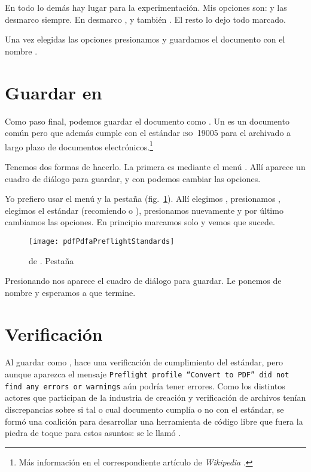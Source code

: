 \documentclass[%
	a5paper,
	10pt,
	twoside,
	openright,
	final,
]{memoir}
\begin{document}
	En todo lo demás hay lugar para la experimentación. Mis opciones son:  y  las desmarco siempre. En  desmarco ,  y también . El resto lo dejo todo marcado.

	Una vez elegidas las opciones presionamos  y guardamos el documento con el nombre .

	\section{Guardar en \texorpdfstring{\pdfa{}}{PDF/A}} Como paso final, podemos guardar el documento como \pdfa. Un \pdfa es un documento \pdf común pero que además cumple con el estándar \textsc{iso~19005} para el archivado a largo plazo de documentos electrónicos.\footnote{Más información en el correspondiente artículo de \emph{Wikipedia} \cite{WikipediaPDFA}.}

	Tenemos dos formas de hacerlo. La primera es mediante el menú . Allí aparece un cuadro de diálogo para guardar, y con  podemos cambiar las opciones.

	Yo prefiero usar el menú  y la pestaña  (fig.~\ref{fig:pdfPdfaPreflightStandards}). Allí elegimos , presionamos , elegimos el estándar (recomiendo  o ), presionamos  nuevamente y por último cambiamos las opciones. En principio marcamos solo  y vemos que sucede.

	\begin{figure}
		\texttt{[image: pdfPdfaPreflightStandards]}
		\caption[ de \acrobat]{ de \acrobat. Pestaña \label{fig:pdfPdfaPreflightStandards}}
	\end{figure}

	Presionando  nos aparece el cuadro de diálogo para guardar. Le ponemos de nombre  y esperamos a que termine.

	\section{Verificación} Al guardar como \pdfa, \acrobat hace una verificación de cumplimiento del estándar, pero aunque aparezca el mensaje \texttt{Preflight profile ``Convert to PDF'' did not find any errors or warnings} aún podría tener errores. Como los distintos actores que participan de la industria de creación y verificación de archivos \pdfa tenían discrepancias sobre si tal o cual documento cumplía o no con el estándar, se formó una coalición para desarrollar una herramienta de código libre que fuera la piedra de toque para estos asuntos: se le llamó \veraPDF.
\end{document}
